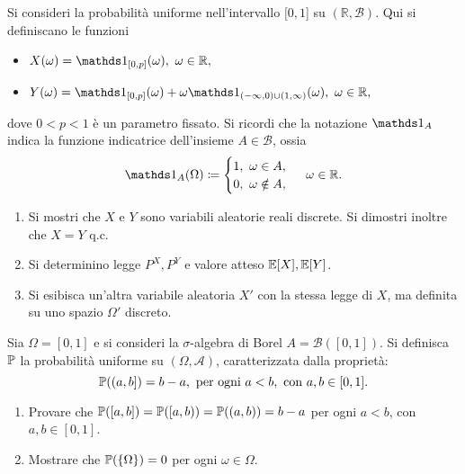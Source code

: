 
Si consideri la probabilità uniforme nell'intervallo $[ 0,1$] su $(\mathbb{R} ,\mathcal{B})$. Qui si definiscano le funzioni
\begin{itemize}
\item $X( \omega ) =\Ind_{[ 0,p]}( \omega ) ,\ \omega \in \mathbb{R} ,$
\item $Y( \omega ) =\Ind_{[ 0,p]}( \omega ) +\omega \Ind_{( -\infty ,0) \cup ( 1,\infty )}( \omega ) ,\ \omega \in \mathbb{R} ,$
\end{itemize}

dove $0< p< 1$ è un parametro fissato. Si ricordi che la notazione $\Ind_{A}$ indica la funzione indicatrice dell'insieme $A\in \mathcal{B}$, ossia
\begin{equation*}
\Ind_{A}( \Omega ) \coloneqq
\begin{cases}
1,\ \omega \in A,\\
0,\ \omega \notin A,
\end{cases}
\ \omega \in \mathbb{R} .
\end{equation*}
\begin{enumerate}
\item Si mostri che $X$ e $Y$ sono variabili aleatorie reali discrete. Si dimostri inoltre che $X=Y$ q.c.
\item Si determinino legge $P^{X} ,P^{Y}$ e valore atteso $\mathbb{E}[ X] ,\mathbb{E}[ Y]$.
\item Si esibisca un'altra variabile aleatoria $X' $ con la stessa legge di $X$, ma definita su uno spazio $\Omega ' $ discreto.
\end{enumerate}

\Esercizio{}

Sia $\Omega =[ 0,1]$ e si consideri la $\sigma $-algebra di Borel $A=\mathcal{B}([ 0,1])$. Si definisca $\mathbb{P}$ la probabilità uniforme su $( \Omega ,\mathcal{A})$, caratterizzata dalla proprietà:
\begin{equation*}
\mathbb{P}(( a,b]) =b-a,\ \text{per ogni} \ a< b,\ \text{con} \ a,b\in [ 0,1] .
\end{equation*}
\begin{enumerate}
\item Provare che $\mathbb{P}([ a,b]) =\mathbb{P}([ a,b)) =\mathbb{P}(( a,b)) =b-a$ per ogni $a< b$, con $a,b\in [ 0,1]$.
\item Mostrare che $\mathbb{P}(\{\Omega \}) =0$ per ogni $\omega \in \Omega $.
\end{enumerate}


